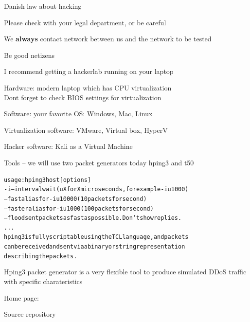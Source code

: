 \documentclass[Screen16to9,17pt]{foils}
\begin{document}
\begin{list2}
\item Danish law about hacking
\item Please check with your legal department, or be careful
\item We {\bf always} contact network between us and the network to be tested
\item Be good netizens
\end{list2}



\begin{list2}
\item I recommend getting a hackerlab running on your laptop
\item Hardware: modern laptop which has CPU virtualization\\
Dont forget to check BIOS settings for virtualization
\item Software: your favorite OS: Windows, Mac, Linux
\item Virtualization software: VMware, Virtual box, HyperV
\item Hacker software: Kali as a Virtual Machine 
\item Tools -- we will use two packet generators today hping3 and t50
\end{list2}



\begin{alltt}\footnotesize
usage: hping3 host [options]
  -i  --interval  wait (uX for X microseconds, for example -i u1000)
      --fast      alias for -i u10000 (10 packets for second)
      --faster    alias for -i u1000 (100 packets for second)
      --flood	   sent packets as fast as possible. Don't show replies.
...
hping3 is fully scriptable using the TCL language, and packets
can be received and sent via a binary or string representation
describing the packets.
\end{alltt}

\begin{list2}
\item Hping3 packet generator is a very flexible tool to produce simulated DDoS traffic with specific charateristics
\item Home page: 
\item Source repository 
\end{list2}
\end{document}
